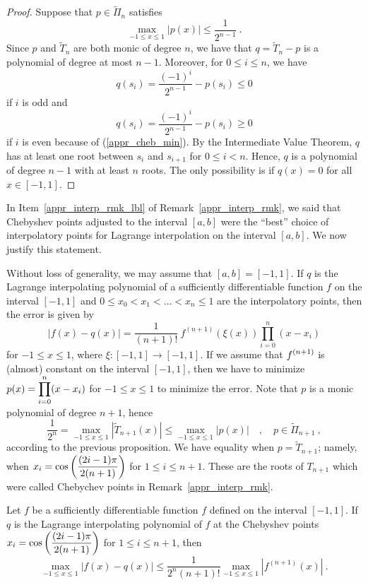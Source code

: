 \begin{proof}
Suppose that $p\in \tilde{\Pi}_n$ satisfies
\begin{equation} \label{appr_cheb_min}
\max_{-1\leq x \leq 1} \left|p(x)\right| \leq \frac{1}{2^{n-1}} \  .
\end{equation}
Since $p$ and $\tilde{T}_n$ are both monic of degree $n$, we have that
$q = \tilde{T}_n-p$ is a polynomial of degree at most $n-1$.  Moreover,
for $0 \leq i \leq n$, we have
\[
  q(s_i) = \frac{(-1)^i}{2^{n-1}} - p(s_i) \leq 0
\]
if $i$ is odd and
\[
  q(s_i) = \frac{(-1)^i}{2^{n-1}} - p(s_i) \geq 0
\]
if $i$ is even because of (\ref{appr_cheb_min}).  By the Intermediate
Value Theorem, $q$ has 
at least one root between $s_i$ and $s_{i+1}$ for $0\leq i < n$.  Hence, $q$
is a polynomial of degree $n-1$ with at least $n$ roots.  The only
possibility is if $q(x) = 0$ for all $x \in [-1,1]$.
\end{proof}

In Item~\ref{appr_interp_rmk_lbl} of Remark~\ref{appr_interp_rmk}, we said
that Chebyshev points adjusted to the interval $[a,b]$ were the ``best''
choice of interpolatory points for Lagrange interpolation on the interval
$[a,b]$.  We now justify this statement.

Without loss of generality, we may assume that $[a,b]=[-1,1]$.
If $q$ is the Lagrange interpolating polynomial of a sufficiently
differentiable function $f$ on the interval $[-1,1]$ and
$0\leq x_0 < x_1 < \ldots < x_n\leq 1$ are the interpolatory points, then the
error is given by
\[
\left| f(x) - q(x) \right| = \frac{1}{(n+1)!}\  f^{(n+1)}(\xi(x))
\prod_{i=0}^n (x-x_i)
\]
for $-1 \leq x \leq 1$, where $\xi:[-1,1]\rightarrow [-1,1]$.  If we
assume that $\displaystyle f^{(n+1)}$ is (almost) constant on the
interval $[-1,1]$, then we have to minimize
$\displaystyle p(x) = \prod_{i=0}^n (x-x_i)$ for $-1 \leq x \leq 1$
to minimize the error.  Note that $p$ is a monic polynomial of degree
$n+1$, hence
\[
\frac{1}{2^n} = \max_{-1\leq x \leq 1} \left| \tilde{T}_{n+1}(x)\right| \leq
\max_{-1\leq x \leq 1} \left| p(x) \right| \quad , \quad p \in
\tilde{\Pi}_{n+1} \  ,
\]
according to the previous proposition.  We have equality when
$p=\tilde{T}_{n+1}$; namely, when
$\displaystyle x_i = \cos\left(\frac{(2i-1)\pi}{2(n+1)}\right)$
for $1\leq i \leq n+1$.  These are the roots of $T_{n+1}$ which were
called Chebychev points in Remark~\ref{appr_interp_rmk}.

\begin{prop}
Let $f$ be a sufficiently differentiable function $f$ defined on the interval
$[-1,1]$.  If $q$ is the Lagrange interpolating polynomial of $f$ at the
Chebyshev points
$\displaystyle x_i = \cos\left(\frac{(2i-1)\pi}{2(n+1)}\right)$
for $1\leq i \leq n+1$, then
\[
\max_{-1\leq x \leq 1} \left| f(x) - q(x) \right| \leq
\frac{1}{2^n (n+1)!}\max_{-1\leq x \leq 1} \left| f^{(n+1)}(x) \right| \  .
\]
\label{ChebyshevTrancMax}
\end{prop}

